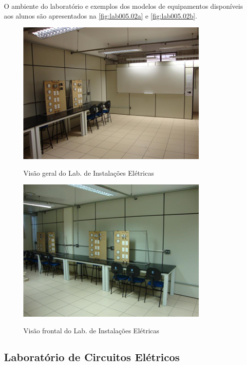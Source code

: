 O ambiente do laboratório e exemplos dos modelos de equipamentos disponíveis aos alunos são apresentados na \autoref{fig:lab005.02a} e \autoref{fig:lab005.02b}.

\begin{figure}[!htb]
    \centering
    \caption{Visão geral do Lab. de Instalações Elétricas}
    \includegraphics[width=0.85\textwidth]{Caps/Figs/lab005.02a.png}
    \fonte{\utf}
    \label{fig:lab005.02a}
\end{figure}

\begin{figure}[!htb]
    \centering
    \caption{Visão frontal do Lab. de Instalações Elétricas}
    \includegraphics[width=0.85\textwidth]{Caps/Figs/lab005.02b.png}
    \fonte{\utf}
    \label{fig:lab005.02b}
\end{figure}

\subsection{Laboratório de Circuitos Elétricos}

